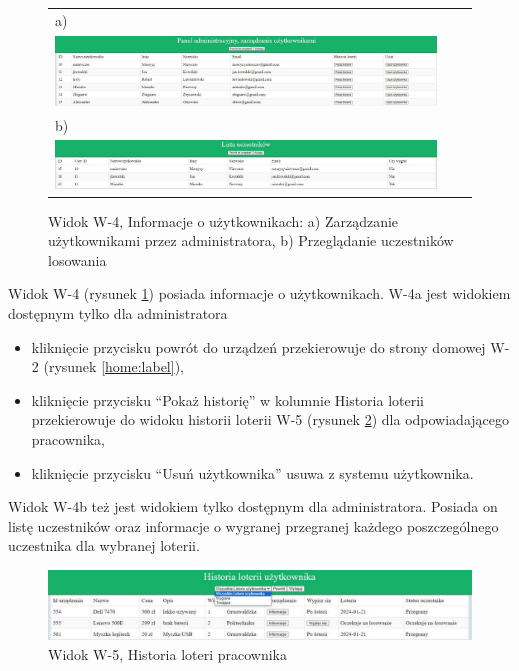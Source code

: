 \begin{figure}[htb]
  \centering
	\begin{tabular}{@{}lll@{}}
	a)\\
  \includegraphics[width=\textwidth]{rys05/view/manageUsers.pdf} \\
	
	b)\\
	\includegraphics[width=\textwidth]{rys05/view/participation.pdf} \\
	
	\end{tabular}
  \caption{Widok W-4, Informacje o użytkownikach: a) Zarządzanie użytkownikami przez administratora, b) Przeglądanie uczestników losowania}
  \label{manageUsers:label}
\end{figure}


Widok W-4 (rysunek \ref{manageUsers:label}) posiada informacje o użytkownikach. W-4a jest widokiem dostępnym tylko dla administratora
\begin{itemize}
	\item kliknięcie przycisku powrót do urządzeń przekierowuje do strony domowej W-2 (rysunek \ref{home:label}),
	\item kliknięcie przycisku "`Pokaż historię"' w kolumnie Historia loterii przekierowuje do widoku historii loterii  W-5 (rysunek \ref{lotteryHistory:label}) dla odpowiadającego pracownika,
	\item kliknięcie przycisku "`Usuń użytkownika"' usuwa z systemu użytkownika.
\end{itemize}
Widok W-4b też jest widokiem tylko dostępnym dla administratora. Posiada on listę uczestników oraz informacje o wygranej przegranej każdego poszczególnego uczestnika dla wybranej loterii.


\begin{figure}[h]
		\centering
    \includegraphics[width=\linewidth]{rys05/view/lotteryHistory.pdf}
    \caption{Widok W-5, Historia loteri pracownika}
    \label{lotteryHistory:label}
\end{figure}


